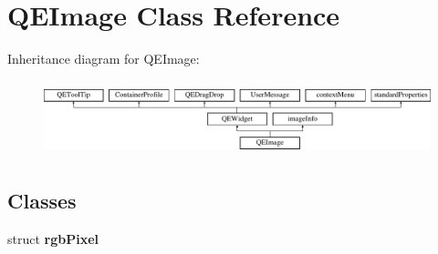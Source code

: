 \hypertarget{classQEImage}{
\section{QEImage Class Reference}
\label{classQEImage}
}
Inheritance diagram for QEImage:\begin{figure}[H]
\begin{center}
\leavevmode
\includegraphics[height=2.204725cm]{classQEImage}
\end{center}
\end{figure}
\subsection*{Classes}
\begin{DoxyCompactItemize}
\item 
struct {\bfseries rgbPixel}
\end{DoxyCompactItemize}
